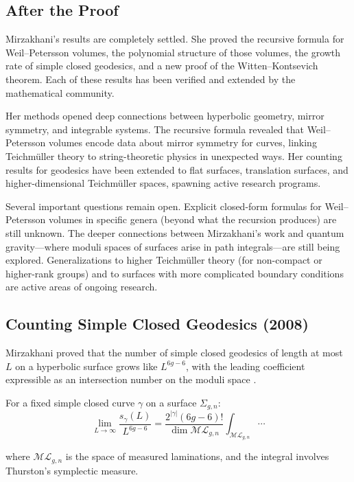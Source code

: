 \subsection{After the Proof}

Mirzakhani's results are completely settled. She proved the recursive formula for Weil--Petersson volumes, the polynomial structure of those volumes, the growth rate of simple closed geodesics, and a new proof of the Witten--Kontsevich theorem. Each of these results has been verified and extended by the mathematical community.

Her methods opened deep connections between hyperbolic geometry, mirror symmetry, and integrable systems. The recursive formula revealed that Weil--Petersson volumes encode data about mirror symmetry for curves, linking Teichm\"uller theory to string-theoretic physics in unexpected ways. Her counting results for geodesics have been extended to flat surfaces, translation surfaces, and higher-dimensional Teichm\"uller spaces, spawning active research programs.

Several important questions remain open. Explicit closed-form formulas for Weil--Petersson volumes in specific genera (beyond what the recursion produces) are still unknown. The deeper connections between Mirzakhani's work and quantum gravity---where moduli spaces of surfaces arise in path integrals---are still being explored. Generalizations to higher Teichm\"uller theory (for non-compact or higher-rank groups) and to surfaces with more complicated boundary conditions are active areas of ongoing research.

\subsection{Counting Simple Closed Geodesics (2008)}

Mirzakhani proved that the number of simple closed geodesics of length at most $L$ on a hyperbolic surface grows like $L^{6g-6}$, with the leading coefficient expressible as an intersection number on the moduli space \cite{mirzakhani2008}.

For a fixed simple closed curve $\gamma$ on a surface $\Sigma_{g,n}$:
\begin{equation}
\lim_{L \to \infty} \frac{s_\gamma(L)}{L^{6g-6}} = \frac{2^{|\gamma|} (6g-6)!}{\dim \mathcal{ML}_{g,n}} \int_{\mathcal{ML}_{g,n}} \cdots
\end{equation}

where $\mathcal{ML}_{g,n}$ is the space of measured laminations, and the integral involves Thurston's symplectic measure.

